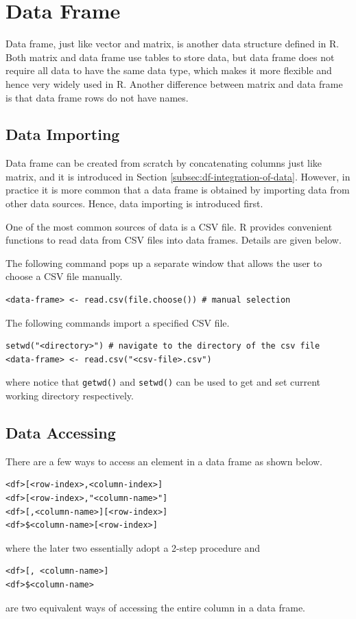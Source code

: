 \section{Data Frame} \label{ch:r1:sec:df}

Data frame, just like vector and matrix, is another data structure defined in R. Both matrix and data frame use tables to store data, but data frame does not require all data to have the same data type, which makes it more flexible and hence very widely used in R. Another difference between matrix and data frame is that data frame rows do not have names.

\subsection{Data Importing}

Data frame can be created from scratch by concatenating columns just like matrix, and it is introduced in Section \ref{subsec:df-integration-of-data}. However, in practice it is more common that a data frame is obtained by importing data from other data sources. Hence, data importing is introduced first.

One of the most common sources of data is a CSV file. R provides convenient functions to read data from CSV files into data frames. Details are given below.

The following command pops up a separate window that allows the user to choose a CSV file manually.
\begin{lstlisting}
<data-frame> <- read.csv(file.choose()) # manual selection
\end{lstlisting}
The following commands import a specified CSV file.
\begin{lstlisting}
setwd("<directory>") # navigate to the directory of the csv file
<data-frame> <- read.csv("<csv-file>.csv")
\end{lstlisting}
where notice that \verb|getwd()| and \verb|setwd()| can be used to get and set current working directory respectively.

\subsection{Data Accessing}

There are a few ways to access an element in a data frame as shown below.
\begin{lstlisting}
<df>[<row-index>,<column-index>]
<df>[<row-index>,"<column-name>"]
<df>[,<column-name>][<row-index>]
<df>$<column-name>[<row-index>]
\end{lstlisting}
where the later two essentially adopt a 2-step procedure and
\begin{lstlisting}
<df>[, <column-name>]
<df>$<column-name>
\end{lstlisting}
are two equivalent ways of accessing the entire column in a data frame.

